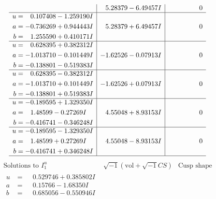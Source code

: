 \documentclass[1p]{elsarticle_modified}
\theoremstyle{definition}
\newcommand{\I}{\sqrt{-1}}
\begin{document}
$$\begin{array}{c|c|c}
 & \phantom{-}5.28379 - 6.49457 I & \phantom{-0.000000 } 0 \\ \hline\begin{aligned}
u &= \phantom{-}0.107408 - 1.259190 I \\
a &= -0.736269 + 0.944443 I \\
b &= \phantom{-}1.255590 + 0.410171 I\end{aligned}
 & \phantom{-}5.28379 + 6.49457 I & \phantom{-0.000000 } 0 \\ \hline\begin{aligned}
u &= \phantom{-}0.628395 + 0.382312 I \\
a &= -1.013710 - 0.101449 I \\
b &= -0.138801 - 0.519383 I\end{aligned}
 & -1.62526 - 0.07913 I & \phantom{-0.000000 } 0 \\ \hline\begin{aligned}
u &= \phantom{-}0.628395 - 0.382312 I \\
a &= -1.013710 + 0.101449 I \\
b &= -0.138801 + 0.519383 I\end{aligned}
 & -1.62526 + 0.07913 I & \phantom{-0.000000 } 0 \\ \hline\begin{aligned}
u &= -0.189595 + 1.329350 I \\
a &= \phantom{-}1.48599 - 0.27269 I \\
b &= -0.416741 - 0.346248 I\end{aligned}
 & \phantom{-}4.55048 + 8.93153 I & \phantom{-0.000000 } 0 \\ \hline\begin{aligned}
u &= -0.189595 - 1.329350 I \\
a &= \phantom{-}1.48599 + 0.27269 I \\
b &= -0.416741 + 0.346248 I\end{aligned}
 & \phantom{-}4.55048 - 8.93153 I & \phantom{-0.000000 } 0\\
 \hline 
 \end{array}$$\newpage$$\begin{array}{c|c|c}  
\text{Solutions to }I^u_{1}& \I (\text{vol} + \sqrt{-1}CS) & \text{Cusp shape}\\
 \hline 
\begin{aligned}
u &= \phantom{-}0.529746 + 0.385802 I \\
a &= \phantom{-}0.15766 - 1.68350 I \\
b &= \phantom{-}0.685056 - 0.550946 I\end{aligned}

\end{array}$$
\end{document}
